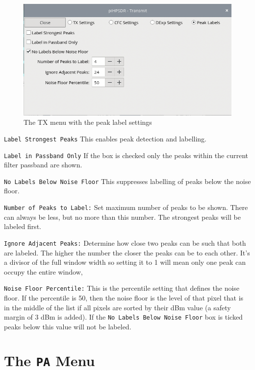 \documentclass[12pt]{book}
\def\rett#1{\texttt{\color{red}#1}}
\begin{document}
\begin{figure}[ht]
\center
\includegraphics[scale=0.45]{TX_PEAK.png}
\caption{The TX menu with the peak label settings}
\label{fig:TXPeakMenu}
\end{figure}

\rett{Label Strongest Peaks} This enables peak detection and labelling.

\rett{Label in Passband Only} If the box is checked only the peaks within the
current filter passband  are shown.

\rett{No Labels Below Noise Floor} This suppresses labelling of peaks below the noise floor.

\rett{Number of Peaks to Label:} Set maximum number of peaks to be shown. There can always be less,
but no more than this number. The strongest peaks will be labeled first.

\rett{Ignore Adjacent Peaks:} Determine how close two peaks can be such that both are labeled.
The higher the number the closer the peaks can be to each other. It's a divisor of the
full window width so setting it to 1 will mean only one peak can occupy the entire window,

\rett{Noise Floor Percentile:} This is the percentile setting that defines the noise floor. If the
percentile is 50, then the noise floor is the level of that pixel that is in the middle of the list
if all pixels are sorted by their dBm value (a safety margin of 3 dBm is added).
If the \rett{No Labels Below Noise Floor} box is ticked
peaks below this value will not be labeled.
\section{The \texttt{PA} Menu}
\end{document}
